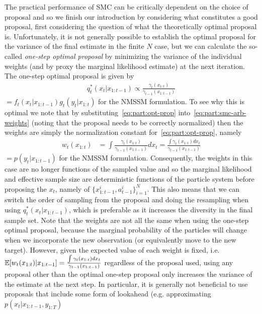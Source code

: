 The practical performance of SMC can be critically dependent on the choice of proposal and
so we finish our introduction by considering what constitutes a good proposal, first
considering the question of what the theoretically optimal proposal is. Unfortunately, it is not generally
possible to establish the optimal proposal for the variance of the final estimate in the finite $N$ case, but we can
calculate the so-called \emph{one-step optimal proposal} by minimizing the variance of the individual weights (and
by proxy the marginal likelihood estimate) at the next iteration.  The one-step optimal proposal is given by
\begin{align}
\label{eq:part:opt-prop}
q_t^*(x_t | x_{1:t-1}) \propto \frac{\gamma_t({x}_{1:t})}{\gamma_{t - 1}({x}_{1:t - 1})} 
\end{align}
$= f_t(x_t | x_{1:t-1}) g_t(y_t | x_{1:t})$ for the NMSSM formulation.  To see why this is optimal we note that
by substituting~\eqref{eq:part:opt-prop} into~\eqref{eq:part:smc-arb-weights} (noting that the proposal needs
to be correctly normalized) then the weights are simply the normalization constant for~\eqref{eq:part:opt-prop}, namely
\begin{align}
w_t(x_{1:t}) &= \int \frac{\gamma_t({x}_{1:t})}{\gamma_{t - 1}({x}_{1:t - 1})} dx_t = 
\frac{\int\gamma_t({x}_{1:t}) dx_t}{\gamma_{t - 1}({x}_{1:t - 1})} 
\end{align}
$=p(y_t | x_{1:t-1})$ for the NMSSM formulation.  Consequently, the weights in this case are no longer
functions of the sampled value and so the marginal likelihood and effective sample size are deterministic
functions of the particle system before proposing the $x_{t}$, namely of $\{x_{1:t-1}^i,a_{t-1}^i\}_{i=1}^N$.
This also means that we can switch the order of sampling from the proposal and doing the resampling when
using $q_t^*(x_t | x_{1:t-1})$, which is preferable as it increases the diversity in the final sample set.
Note that the weights are not all the same when using the one-step optimal proposal, because
the marginal probability of the particles will change when we incorporate the new observation (or equivalently
move to the new target).  However, given the expected value of each weight is fixed, i.e. $\mathbb{E} [w_t(x_{1:t}) | x_{1:t-1}]=
\frac{\int  \gamma_t({x}_{1:t}) dx_t}{\gamma_{t - 1}({x}_{1:t - 1})} $ regardless of the proposal
used, using any proposal other than the optimal one-step proposal only increases the variance of the estimate
at the next step.  In particular, it is generally
not beneficial to use proposals that include some form of lookahead (e.g. approximating $p(x_{t} |x_{1:t-1},y_{1:T})$
